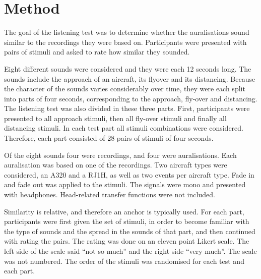
\section{Method} %

The goal of the listening test was to determine whether the auralisations sound
similar to the recordings they were based on. Participants were presented with
pairs of stimuli and asked to rate how similar they sounded.


Eight different sounds were considered and they were each 12 seconds long. The
sounds include the approach of an aircraft, its flyover and its distancing.
Because the character of the sounds varies considerably over time, they were
each split into parts of four seconds, corresponding to the approach, fly-over
and distancing. The listening test was also divided in these three parts. First,
participants were presented to all approach stimuli, then all fly-over stimuli
and finally all distancing stimuli. In each test part all stimuli combinations
were considered. Therefore, each part consisted of 28 pairs of stimuli of four
seconds.

Of the eight sounds four were recordings, and four were auralisations. Each
auralisation was based on one of the recordings. Two aircraft types were
considered, an A320 and a RJ1H, as well as two events per aircraft type.
Fade in and fade out was applied to the stimuli. The signals were mono and
presented with headphones. Head-related transfer functions were not included.

Similarity is relative, and therefore an anchor is typically used. For each
part, participants were first given the set of stimuli, in order to become
familiar with the type of sounds and the spread in the sounds of that part, and
then continued with rating the pairs. The rating was done on an eleven point
Likert scale. The left side of the scale said ``not so much'' and the right side
``very much''. The scale was not numbered. The order of the stimuli was
randomised for each test and each part.

